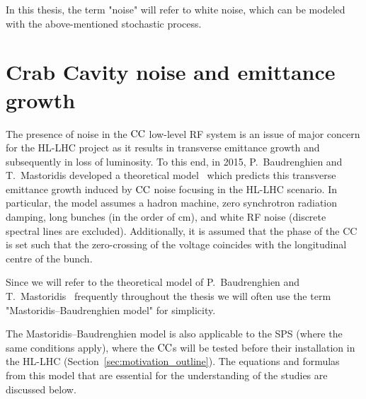 In this thesis, the term "noise" will refer to white noise, which can be modeled with the above-mentioned stochastic process.





\section{Crab Cavity noise and emittance growth}\label{sec:CC_noise_intro}
The presence of noise in the ${\mathrm{CC}}$ low-level RF system is an issue of major concern for the HL-LHC project as it results in transverse emittance growth and subsequently in loss of luminosity. To this end, in 2015, P.~Baudrenghien and T.~Mastoridis developed a theoretical model~\cite{PhysRevSTAB.18.101001} which predicts this transverse emittance growth induced by ${\mathrm{CC}}$ noise focusing in the HL-LHC scenario. In particular, the model assumes a hadron machine, zero synchrotron radiation damping, long bunches (in the order of cm), and white RF noise (discrete spectral lines are excluded). Additionally, it is assumed that the phase of the CC is set such that the zero-crossing of the voltage coincides with the longitudinal centre of the bunch.

Since we will refer to the theoretical model of P.~Baudrenghien and T.~Mastoridis~\cite{PhysRevSTAB.18.101001} frequently throughout the thesis we will often use the term "Mastoridis--Baudrenghien model" for simplicity.

The Mastoridis--Baudrenghien model is also applicable to the SPS (where the same conditions apply), where the ${\mathrm{CC}}$s will be tested before their installation in the HL-LHC (Section~\ref{sec:motivation_outline}). The equations and formulas from this model that are essential for the understanding of the studies are discussed below.




